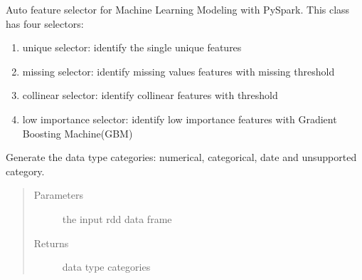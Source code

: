 \documentclass[letterpaper,11pt,english]{sphinxmanual}
\begin{document}
\begin{fulllineitems}
\label{\detokenize{auto_feature:AutoFeatures.AutoFeatures}}
Auto feature selector for Machine Learning Modeling with PySpark. This class has four selectors:
\begin{enumerate}
\def\theenumi{\arabic{enumi}}
\def\labelenumi{\theenumi .}
\makeatletter\def\p@enumii{\p@enumi \theenumi .}\makeatother
\item {} 
unique selector: identify the single unique features

\item {} 
missing selector: identify missing values features with missing threshold

\item {} 
collinear selector: identify collinear features with threshold

\item {} 
low importance selector: identify low importance features with Gradient Boosting Machine(GBM)

\end{enumerate}

\begin{fulllineitems}
\label{\detokenize{auto_feature:AutoFeatures.AutoFeatures.dtypes_class}}
Generate the data type categories: numerical, categorical, date and unsupported category.
\begin{quote}\begin{description}
\item[{Parameters}] \leavevmode
{} \textendash{} the input rdd data frame

\item[{Returns}] \leavevmode
data type categories

\end{description}\end{quote}


\end{fulllineitems}
\end{fulllineitems}
\end{document}

